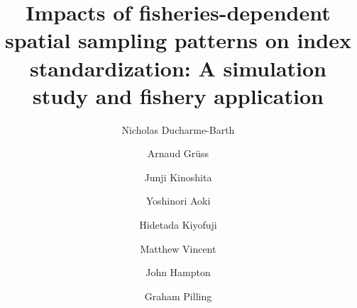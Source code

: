 \documentclass[authoryear,preprint,review,12pt]{elsarticle}
\begin{document}
\begin{frontmatter}

\title{Impacts of fisheries-dependent spatial sampling patterns on index standardization: A simulation study and fishery application}


\author[address.1]{Nicholas Ducharme-Barth}
\author[address.2]{Arnaud Gr\"uss}
\author[address.3]{Junji Kinoshita}
\author[address.4]{Yoshinori Aoki}
\author[address.4]{Hidetada Kiyofuji}
\author[address.1]{Matthew Vincent}
\author[address.1]{John Hampton}
\author[address.1]{Graham Pilling}

\address[address.1]{Pacific Community, B.P. D5 98848 Noumea, New Caledonia}
\address[address.2]{School of Aquatic and Fishery Sciences, University of Washington, Box 355020, Seattle, WA, 98105-5020, USA}
\address[address.3]{National Research Institute of Far Seas Fisheries, Japan Fisheries Research and Education Agency, Yokohama, Kanagawa, Japan}
\address[address.4]{National Research Institute of Far Seas Fisheries, Japan Fisheries Research and Education Agency, Shimizu-ku, Shizuoka-shi, Shizuoka 424-8633 Japan}


\end{frontmatter}
\end{document}
